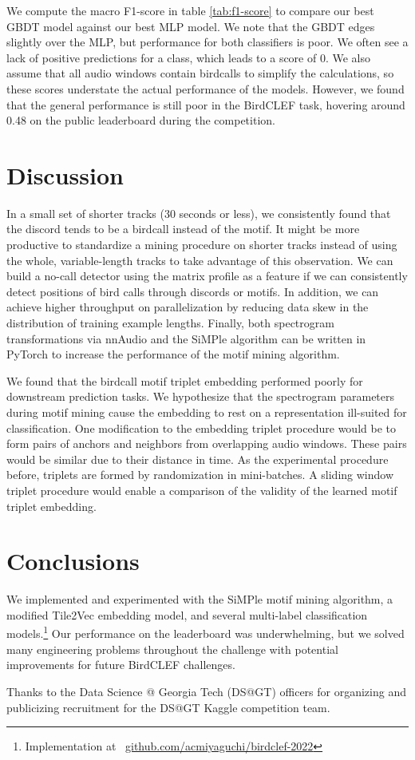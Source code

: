 \documentclass[
]{ceurart}
\begin{document}
We compute the macro F1-score in table \ref{tab:f1-score} to compare our best GBDT model against our best MLP model. We note that the GBDT edges slightly over the MLP, but performance for both classifiers is poor. We often see a lack of positive predictions for a class, which leads to a score of 0. We also assume that all audio windows contain birdcalls to simplify the calculations, so these scores understate the actual performance of the models. However, we found that the general performance is still poor in the BirdCLEF task, hovering around 0.48 on the public leaderboard during the competition.

\section{Discussion}

In a small set of shorter tracks (30 seconds or less), we consistently found that the discord tends to be a birdcall instead of the motif. It might be more productive to standardize a mining procedure on shorter tracks instead of using the whole, variable-length tracks to take advantage of this observation. We can build a no-call detector using the matrix profile as a feature if we can consistently detect positions of bird calls through discords or motifs. In addition, we can achieve higher throughput on parallelization by reducing data skew in the distribution of training example lengths. Finally, both spectrogram transformations via nnAudio and the SiMPle algorithm can be written in PyTorch to increase the performance of the motif mining algorithm.

We found that the birdcall motif triplet embedding performed poorly for downstream prediction tasks. We hypothesize that the spectrogram parameters during motif mining cause the embedding to rest on a representation ill-suited for classification. One modification to the embedding triplet procedure would be to form pairs of anchors and neighbors from overlapping audio windows. These pairs would be similar due to their distance in time. As the experimental procedure before, triplets are formed by randomization in mini-batches. A sliding window triplet procedure would enable a comparison of the validity of the learned motif triplet embedding.

\section{Conclusions}

We implemented and experimented with the SiMPle motif mining algorithm, a modified Tile2Vec embedding model, and several multi-label classification models.\footnote{Implementation at \
\href{https://github.com/acmiyaguchi/birdclef-2022}{github.com/acmiyaguchi/birdclef-2022}}
Our performance on the leaderboard was underwhelming, but we solved many engineering problems throughout the challenge with potential improvements for future BirdCLEF challenges.

\begin{acknowledgments}
Thanks to the Data Science @ Georgia Tech (DS@GT) officers for organizing and publicizing recruitment for the DS@GT Kaggle competition team.
\end{acknowledgments}


\appendix
\end{document}
